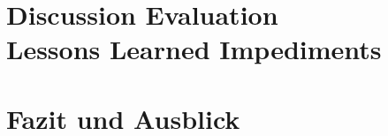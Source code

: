 \documentclass[conference,a4paper]{cs-techrep}
\begin{document}


\section{Discussion \textbar{} Evaluation \textbar{} \\ Lessons Learned \textbar{} Impediments}
\lipsum[6]

\section{Fazit und Ausblick} %
\lipsum[7]


\sloppy
\printbibliography[notcategory=selfref]
\end{document}
